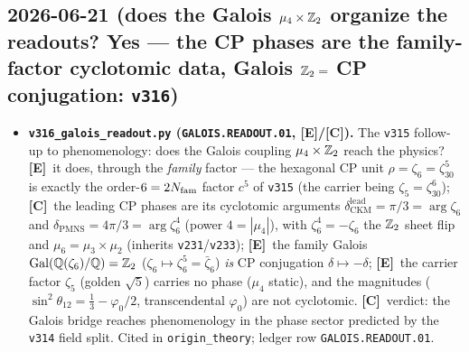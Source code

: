 \documentclass[11pt]{article}
\providecommand{\mE}{\textbf{[E]}}\providecommand{\mC}{\textbf{[C]}}
\begin{document}
\subsection*{2026-06-21 (does the Galois $\mu_4\times\mathbb{Z}_2$ organize the readouts? Yes --- the CP phases are the family-factor cyclotomic data, Galois $\mathbb{Z}_2=$ CP conjugation: \texttt{v316})}
\begin{itemize}
\item \textbf{\texttt{v316\_galois\_readout.py} (\texttt{GALOIS.READOUT.01}, \mE/\mC).} The \texttt{v315} follow-up to
  phenomenology: does the Galois coupling $\mu_4\times\mathbb{Z}_2$ reach the physics? \mE\ it does, through the \emph{family}
  factor --- the hexagonal CP unit $\rho=\zeta_6=\zeta_{30}^5$ is exactly the order-$6=2N_{\mathrm{fam}}$ factor $c^5$ of
  \texttt{v315} (the carrier being $\zeta_5=\zeta_{30}^6$); \mC\ the leading CP phases are its cyclotomic arguments
  $\delta_{\mathrm{CKM}}^{\mathrm{lead}}=\pi/3=\arg\zeta_6$ and $\delta_{\mathrm{PMNS}}=4\pi/3=\arg\zeta_6^4$ (power
  $4=|\mu_4|$), with $\zeta_6^4=-\zeta_6$ the $\mathbb{Z}_2$ sheet flip and $\mu_6=\mu_3\times\mu_2$ (inherits
  \texttt{v231}/\texttt{v233}); \mE\ the family Galois $\mathrm{Gal}(\mathbb Q(\zeta_6)/\mathbb Q)=\mathbb{Z}_2$
  ($\zeta_6\mapsto\zeta_6^5=\bar\zeta_6$) \emph{is} CP conjugation $\delta\mapsto-\delta$; \mE\ the carrier factor
  $\zeta_5$ (golden $\sqrt5$) carries no phase ($\mu_4$ static), and the magnitudes
  ($\sin^2\theta_{12}=\tfrac13-\varphi_0/2$, transcendental $\varphi_0$) are not cyclotomic. \mC\ verdict: the Galois
  bridge reaches phenomenology in the phase sector predicted by the \texttt{v314} field split. Cited in
  \texttt{origin\_theory}; ledger row \texttt{GALOIS.READOUT.01}.
\end{itemize}
\end{document}
